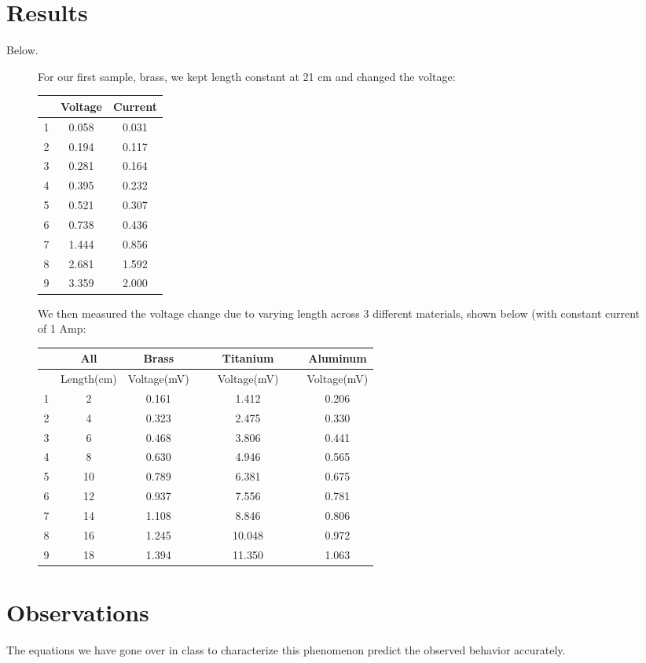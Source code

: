 \documentclass{article}
\begin{document}
\section{Results}
Below.
\begin{figure}[h!]
	For our first sample, brass, we kept length constant at 21 cm and changed the voltage:
	
	\centering
	\begin{tabular}{|c|c|c|}
	\hline	
	\ & Voltage & Current\\
	\hline
	\hline
	1 & 0.058 & 0.031\\
	\hline
	2 & 0.194 & 0.117\\
	\hline
	3 & 0.281 & 0.164\\
	\hline
	4 & 0.395 & 0.232\\
	\hline
	5 & 0.521 & 0.307\\
	\hline
	6 & 0.738 & 0.436\\
	\hline
	7 & 1.444 & 0.856\\
	\hline
	8 & 2.681 & 1.592\\
	\hline
	9 & 3.359 & 2.000\\
	\hline
	\end{tabular}
\end{figure}
\begin{figure}[h!]
	We then measured the voltage change due to varying length across 3 different materials, shown below (with constant current of 1 Amp:
	\centering
	\begin{tabular}{|c|c|c|c|c|c|c|}
		\hline
		\ & All & Brass & \ & Titanium & \ & Aluminum\\
		\hline
		\ & Length(cm) & Voltage(mV) & \ & Voltage(mV)	& \ &  Voltage(mV)\\
		\hline
		\hline
		1 & 2 & 0.161 & \ & 1.412 & \ & 0.206\\
		\hline
		2 & 4 & 0.323 & \ & 2.475 & \ & 0.330\\
		\hline
		3 & 6 & 0.468 & \ & 3.806 & \ & 0.441\\
		\hline
		4 & 8 & 0.630 & \ & 4.946 & \ & 0.565\\
		\hline
		5 & 10 & 0.789 & \ & 6.381 & \ & 0.675\\
		\hline
		6 & 12 & 0.937 & \ & 7.556 & \ & 0.781\\
		\hline
		7 & 14 & 1.108 & \ & 8.846 & \ & 0.806\\
		\hline
		8 & 16 & 1.245 & \ & 10.048 & \ & 0.972\\
		\hline
		9 & 18 & 1.394 & \ & 11.350 & \ & 1.063\\
		\hline
	\end{tabular}
\end{figure}

\section{Observations}

The equations we have gone over in class to characterize this phenomenon predict the observed behavior accurately.
\end{document}
